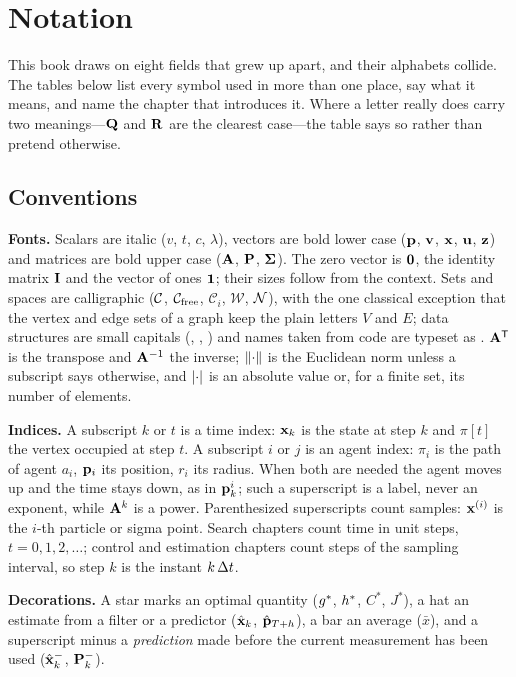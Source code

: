 \chapter{Notation}

This book draws on eight fields that grew up apart, and their alphabets
collide. The tables below list every symbol used in more than one place, say
what it means, and name the chapter that introduces it. Where a letter really
does carry two meanings---$\mathbf{Q}$ and $\mathbf{R}$ are the clearest case---the
table says so rather than pretend otherwise.

\section*{Conventions}

\textbf{Fonts.} Scalars are italic ($v$, $t$, $c$, $\lambda$), vectors are bold
lower case ($\mathbf{p}$, $\mathbf{v}$, $\mathbf{x}$, $\mathbf{u}$, $\mathbf{z}$) and matrices are bold
upper case ($\mathbf{A}$, $\mathbf{P}$, $\mathbf{\Sigma}$). The zero vector is
$\mathbf{0}$, the identity matrix $\mathbf{I}$ and the vector of ones $\mathbf{1}$;
their sizes follow from the context. Sets and spaces are calligraphic
($\mathcal{C}$, $\mathcal{C}_{\mathrm{free}}$, $\mathcal{C}_i$, $\mathcal{W}$, $\mathcal{N}$), with the one
classical exception that the vertex and edge sets of a graph keep the plain
letters $V$ and $E$; data structures are small capitals (\Open, \Closed,
\Focal) and names taken from code are typeset as . $\mathbf{A}^{\mathsf{T}}$ is
the transpose and $\mathbf{A}^{-1}$ the inverse; $\left\lVert \cdot \right\rVert$ is the Euclidean
norm unless a subscript says otherwise, and $\left\lvert \cdot \right\rvert$ is an absolute value
or, for a finite set, its number of elements.

\textbf{Indices.} A subscript $k$ or $t$ is a time index: $\mathbf{x}_k$ is the
state at step $k$ and $\pi[t]$ the vertex occupied at step $t$. A subscript $i$
or $j$ is an agent index: $\pi_i$ is the path of agent $a_i$, $\mathbf{p}_i$ its
position, $r_i$ its radius. When both are needed the agent moves up and the
time stays down, as in $\mathbf{p}^i_k$; such a superscript is a label, never an
exponent, while $\mathbf{A}^{k}$ is a power. Parenthesized superscripts count
samples: $\mathbf{x}^{(i)}$ is the $i$-th particle or sigma point. Search chapters
count time in unit steps, $t=0,1,2,\dots$; control and estimation chapters
count steps of the sampling interval, so step $k$ is the instant $k\,\Delta t$.

\textbf{Decorations.} A star marks an optimal quantity ($g^*$, $h^*$,
$C^*$, $J^*$), a hat an estimate from a filter or a predictor
($\hat{\mathbf{x}}_k$, $\hat{\mathbf{p}}_{T+h}$), a bar an average ($\bar{x}$), and a
superscript minus a \emph{prediction} made before the current measurement has
been used ($\hat{\mathbf{x}}_k^-$, $\mathbf{P}_k^-$).

